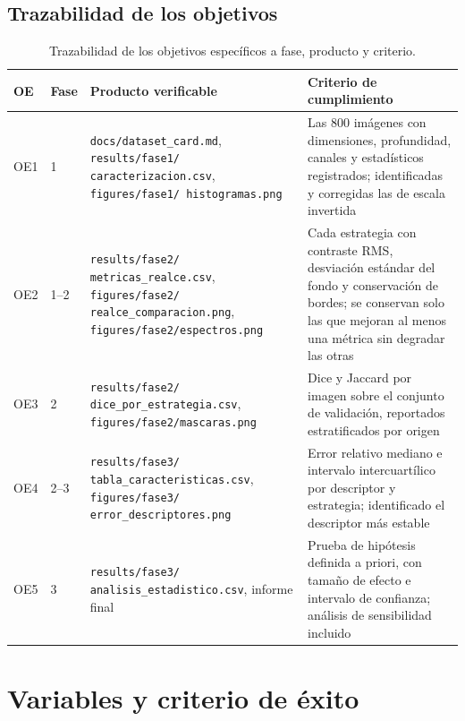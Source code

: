 \documentclass[12pt,a4paper]{article}
\begin{document}
\subsection{Trazabilidad de los objetivos}

\begin{table}[H]
\centering
\caption{Trazabilidad de los objetivos específicos a fase, producto y criterio.}
\small
\footnotesize
\begin{tabular}{@{}p{0.7cm}p{0.9cm}p{5.8cm}p{4.9cm}@{}}
\toprule
\textbf{OE} & \textbf{Fase} & \textbf{Producto verificable} & \textbf{Criterio de cumplimiento} \\
\midrule
OE1 & 1 & \texttt{docs/dataset\_card.md}, \texttt{results/fase1/ caracterizacion.csv}, \texttt{figures/fase1/ histogramas.png} & Las 800 imágenes con dimensiones, profundidad, canales y estadísticos registrados; identificadas y corregidas las de escala invertida \\
\addlinespace
OE2 & 1--2 & \texttt{results/fase2/ metricas\_realce.csv}, \texttt{figures/fase2/ realce\_comparacion.png}, \texttt{figures/fase2/espectros.png} & Cada estrategia con contraste RMS, desviación estándar del fondo y conservación de bordes; se conservan solo las que mejoran al menos una métrica sin degradar las otras \\
\addlinespace
OE3 & 2 & \texttt{results/fase2/ dice\_por\_estrategia.csv}, \texttt{figures/fase2/mascaras.png} & Dice y Jaccard por imagen sobre el conjunto de validación, reportados estratificados por origen \\
\addlinespace
OE4 & 2--3 & \texttt{results/fase3/ tabla\_caracteristicas.csv}, \texttt{figures/fase3/ error\_descriptores.png} & Error relativo mediano e intervalo intercuartílico por descriptor y estrategia; identificado el descriptor más estable \\
\addlinespace
OE5 & 3 & \texttt{results/fase3/ analisis\_estadistico.csv}, informe final & Prueba de hipótesis definida a priori, con tamaño de efecto e intervalo de confianza; análisis de sensibilidad incluido \\
\bottomrule
\end{tabular}
\end{table}

\section{Variables y criterio de éxito}
\end{document}
